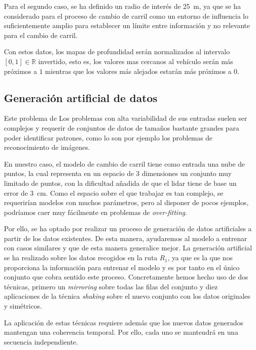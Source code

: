Para el segundo caso, se ha definido un radio de interés de \SI{25}{\meter}, ya que se ha considerado para el proceso de cambio de carril como un entorno de influencia lo suficientemente amplio para establecer un límite entre información y no relevante para el cambio de carril.

Con estos datos, los mapas de profundidad serán normalizados al intervalo $[0, 1] \in \mathbb{R}$ invertido, esto es, los valores mas cercanos al vehículo serán más próximos a $1$ mientras que los valores más alejados estarán más próximos a $0$.

\subsection{Generación artificial de datos}

Este problema de Los problemas con alta variabilidad de sus entradas suelen ser complejos y requerir de conjuntos de datos de tamaños bastante grandes para poder identificar patrones, como lo son por ejemplo los problemas de reconocimiento de imágenes.

En nuestro caso, el modelo de cambio de carril tiene como entrada una nube de puntos, la cual representa en un espacio de $3$ dimensiones un conjunto muy limitado de puntos, con la dificultad añadida de que el \acrshort{lidar} tiene de base un error de \SI{3}{\cm}. Como el espacio sobre el que trabajar es tan complejo, se requerirían modelos con muchos parámetros, pero al disponer de pocos ejemplos, podríamos caer muy fácilmente en problemas de \textit{over-fitting}.

Por ello, se ha optado por realizar un proceso de generación de datos artificiales a partir de los datos existentes. De esta manera, ayudaremos al modelo a entrenar con casos similares y que de esta manera generalice mejor. La generación artificial se ha realizado sobre los datos recogidos en la ruta $R_1$, ya que es la que nos proporciona la información para entrenar el modelo y es por tanto en el único conjunto que cobra sentido este proceso. Concretamente hemos hecho uso de dos técnicas, primero un \textit{mirroring} sobre todas las filas del conjunto y diez aplicaciones de la técnica \textit{shaking} sobre el nuevo conjunto con los datos originales y simétricos.

La aplicación de estas técnicas requiere además que los nuevos datos generados mantengan una coherencia temporal. Por ello, cada uno se mantendrá en una secuencia independiente.

